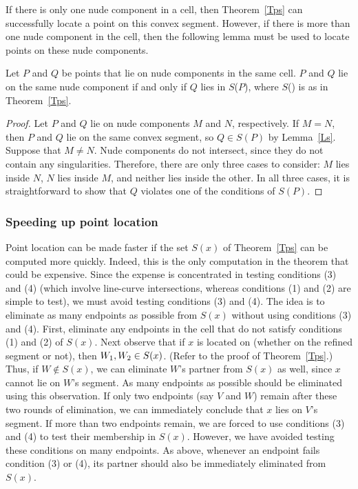 If there is only one nude component in a cell, then Theorem~\ref{Tps} 
can successfully locate a point on this convex segment.
However, if there is more than one nude component in the cell, then the 
following
lemma must be used to locate points on these nude components.

\begin{lemma}
\label{Ln}
Let $P$ and $Q$ be points that lie on nude components in the same cell.
$P$ and $Q$ lie on the same nude component if and only if 
$Q$ lies in $S${\rm (}$P${\rm )}, where $S${\rm ()} is as in 
Theorem~{\rm\ref{Tps}}.
\end{lemma}
\begin{proof}
Let $P$ and $Q$ lie on nude components $M$ and $N$, respectively.
If $M=N$, then $P$ and $Q$ lie on the same convex segment, so 
$Q \in S(P)$ by
Lemma~\ref{Ls}.
Suppose that $M \neq N$.
Nude components do not intersect, since they do not contain any 
singularities.
Therefore, there are only three cases to consider: $M$ lies inside $N$, 
$N$ lies 
inside $M$, and neither lies inside the other.
In all three cases, it is straightforward to show that $Q$ violates one 
of the conditions
of $S(P)$.
\end{proof}

\subsubsection{Speeding up point location}
\label{ss-speeeeed}

Point location can be made faster if the set $S(x)$ of Theorem~\ref{Tps} 
can be
computed more quickly.
Indeed, this is the only computation in the theorem that could be expensive.
Since the expense is concentrated in testing conditions (3) and (4) 
(which involve
line-curve intersections, whereas conditions (1) and (2) are simple 
to test),
we must avoid testing conditions (3) and (4).
The idea is to eliminate as many endpoints as possible from $S(x)$ 
without using
conditions (3) and (4).
First, eliminate any endpoints in the cell that do not satisfy 
conditions (1) and (2) 
of $S(x)$.
Next observe that if $x$ is located on \arc{\wo\wt}
(whether on the refined segment or not), then $\mbox{$W_{1}$},\mbox{$W_{2}$} \in S(x)$.
(Refer to the proof of Theorem~\ref{Tps}.)
Thus, if $W \not\in S(x)$, we can eliminate $W$'s partner from $S(x)$ 
as well,
since $x$ cannot lie on $W$'s segment.
As many endpoints as possible should be eliminated using this observation.
If only two endpoints (say $V$ and $W$) remain after these two rounds of 
elimination,
we can immediately conclude that $x$ lies on $V$'s segment.
If more than two endpoints remain, we are forced to use conditions (3) 
and (4) to test
their membership in $S(x)$.
However, we have avoided testing these conditions on many endpoints.
As above, whenever an endpoint fails condition (3) or (4), its partner 
should also be
immediately eliminated from $S(x)$.

